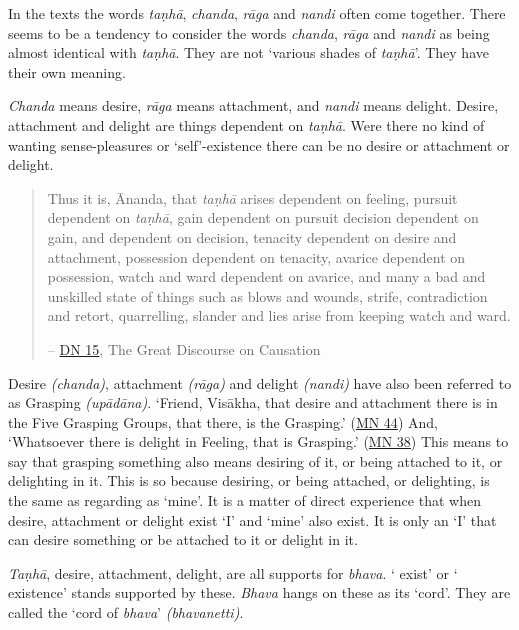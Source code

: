 In the texts the words \emph{taṇhā}, \emph{chanda}, \emph{rāga} and \emph{nandi} often come together. There seems to be a tendency to consider the words \emph{chanda}, \emph{rāga} and \emph{nandi} as being almost identical with \emph{taṇhā}. They are not `various shades of \emph{taṇhā}'. They have their own meaning.

\emph{Chanda} means desire, \emph{rāga} means attachment, and \emph{nandi} means delight. Desire, attachment and delight are things dependent on \emph{taṇhā}. Were there no kind of wanting sense-pleasures or `self'-existence there can be no desire or attachment or delight.

\begin{quote}
Thus it is, Ānanda, that \emph{taṇhā} arises dependent on feeling, pursuit dependent on \emph{taṇhā}, gain dependent on pursuit decision dependent on gain,  and  dependent on decision, tenacity dependent on desire and attachment, possession dependent on tenacity, avarice dependent on possession, watch and ward dependent on avarice, and many a bad and unskilled state of things such as blows and wounds, strife, contradiction and retort, quarrelling, slander and lies arise from keeping watch and ward.

 -- \href{https://suttacentral.net/dn15/en/bodhi}{DN 15}, The Great Discourse on Causation
\end{quote}

Desire \emph{(chanda)}, attachment \emph{(rāga)} and delight \emph{(nandi)} have also been referred to as Grasping \emph{(upādāna)}. `Friend, Visākha, that desire and attachment there is in the Five Grasping Groups, that there, is the Grasping.' (\href{https://suttacentral.net/mn44/en/sujato}{MN 44}) And, `Whatsoever there is delight in Feeling, that is Grasping.' (\href{https://suttacentral.net/mn38/en/bodhi}{MN 38}) This means to say that grasping something also means desiring of it, or being attached to it, or delighting in it. This is so because desiring, or being attached, or delighting, is  the same as regarding as `mine'. It is a matter of direct experience that when desire, attachment or delight exist `I' and `mine' also exist. It is only an `I' that can desire something or be attached to it or delight in it.

\emph{Taṇhā}, desire, attachment, delight, are all supports for \emph{bhava}. ` exist' or ` existence' stands supported by these. \emph{Bhava} hangs on these as its `cord'. They are called the `cord of \emph{bhava}' \emph{(bhavanetti)}.

